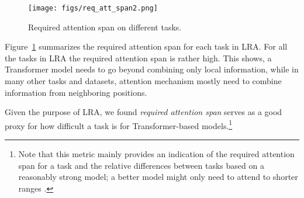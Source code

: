 \documentclass{article} \usepackage{iclr2021_conference,times}
\begin{document}
\begin{figure}[H]
\centering
 \texttt{[image: figs/req\_att\_span2.png]}
    \caption{Required attention span on different tasks.}
    \label{fig:req_att_span}
\end{figure}
Figure~\ref{fig:req_att_span} summarizes the required attention span for each task in LRA. 
For all the tasks in LRA the required attention span is rather high. This shows, a Transformer model needs to go beyond combining only local information, while in many other tasks and datasets, attention mechanism mostly need to combine information from neighboring positions. 

 
Given the purpose of LRA, we found \emph{required attention span} serves as a good proxy for how difficult a task is for Transformer-based models.\footnote{Note that this metric mainly provides an indication of the required attention span for a task and the relative differences between tasks based on a reasonably strong model; a better model might only need to attend to shorter ranges \citep{Daniluk2017,Rae2020}.}
\end{document}
